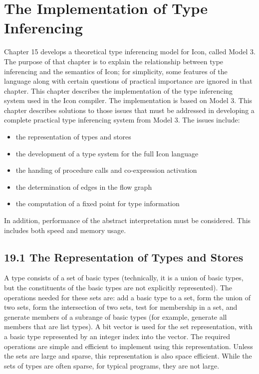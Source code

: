 \chapter{The Implementation of Type Inferencing}

Chapter 15 develops a theoretical type inferencing model for Icon,
called Model 3. The purpose of that chapter is to explain the
relationship between type inferencing and the semantics of Icon; for
simplicity, some features of the language along with certain questions
of practical importance are ignored in that chapter. This chapter
describes the implementation of the type inferencing system used in
the Icon compiler. The implementation is based on Model 3. This
chapter describes solutions to those issues that must be addressed in
developing a complete practical type inferencing system from Model
3. The issues include:

\liststyleLxxi
\begin{itemize}
\item 
the representation of types and stores 
\item 
the development of a type system for the full Icon language 
\item 
the handing of procedure calls and co-expression activation 
\item 
the determination of edges in the flow graph 
\item 
the computation of a fixed point for type information 
\end{itemize}

In addition, performance of the abstract interpretation must be
considered. This includes both speed and memory usage.


\section[19.1 The Representation of Types and Stores]{19.1 The Representation of Types and Stores}

A type consists of a set of basic types (technically, it is a union of
basic types, but the constituents of the basic types are not
explicitly represented). The operations needed for these sets are: add
a basic type to a set, form the union of two sets, form the
intersection of two sets, test for membership in a set, and generate
members of a subrange of basic types (for example, generate all
members that are list types). A bit vector is used for the set
representation, with a basic type represented by an integer index into
the vector. The required operations are simple and efficient to
implement using this representation. Unless the sets are large and
sparse, this representation is also space efficient. While the sets of
types are often sparse, for typical programs, they are not large.

